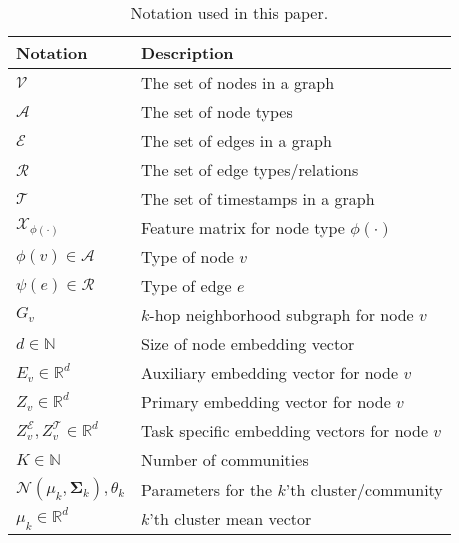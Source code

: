 \begin{table}[t]
\centering
\caption{
    Notation used in this paper.
    \label{tab:notation}
}
\small
    \begin{tabular}{>{\centering\arraybackslash}m{2.1cm}|p{6cm}}
        \hline
        \textbf{Notation}           & \textbf{Description} \\ \hline
        $\mathcal{V}$               & The set of nodes in a graph                   \\ \hline
        $\mathcal{A}$               & The set of node types                         \\ \hline
        $\mathcal{E}$               & The set of edges in a graph                   \\ \hline
        $\mathcal{R}$               & The set of edge types/relations               \\ \hline
        $\mathcal{T}$               & The set of timestamps in a graph              \\ \hline
        $\mathcal{X}_{\phi(\cdot)}$ & Feature matrix for node type $\phi(\cdot)$    \\ \hline
        $\phi(v) \in \mathcal{A}$   & Type of node $v$                              \\ \hline
        $\psi(e) \in \mathcal{R}$   & Type of edge $e$                              \\ \hline
        $G_v$                       & $k$-hop neighborhood subgraph for node $v$    \\ \hline
        $d \in \mathbb{N}$          & Size of node embedding vector                 \\ \hline
        $E_v \in \mathbb{R}^d$      & Auxiliary embedding vector for node $v$       \\ \hline
        $Z_v \in \mathbb{R}^d$      & Primary embedding vector for node $v$         \\ \hline
        $Z_v^{\mathcal{E}}, Z_v^{\mathcal{T}} \in \mathbb{R}^d$ & Task specific embedding vectors for node $v$         \\ \hline
        $K \in \mathbb{N}$                                      & Number of communities                         \\ \hline
        $\mathcal{N}(\mu_k, \boldsymbol{\Sigma}_k), \theta_k$   & Parameters for the $k$'th cluster/community   \\ \hline
        ${\mu_k} \in \mathbb{R}^d$                              & $k$'th cluster mean vector                    \\ \hline

\end{tabular}
\end{table}
